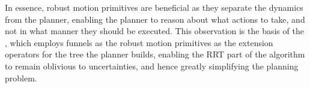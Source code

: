 In essence, robust motion primitives are beneficial as they separate the
dynamics from the planner, enabling the planner to reason about what actions to
take, and not in what manner they should be executed. This observation is the
basis of the \rrtfunnel{}, which employs funnels as the robust motion primitives
as the extension operators for the tree the planner builds, enabling the
\ac{RRT} part of the \rrtfunnel{} algorithm to remain oblivious to
uncertainties, and hence greatly simplifying the planning problem.


